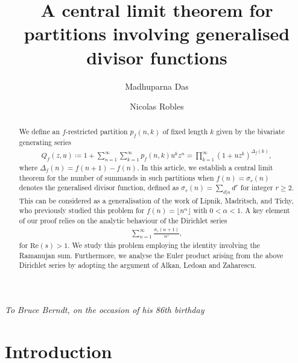 \documentclass[12pt, oneside,reqno]{amsart}
\title{A central limit theorem for partitions involving generalised divisor functions}
\author[1]{Madhuparna Das}
\author[2]{Nicolas Robles}
\date{}
\numberwithin{equation}{section}
\begin{document}
\maketitle

\begin{center}
{\it To Bruce Berndt, on the occasion of his 86th birthday}
\end{center}

\begin{abstract}
We define an $f$-restricted partition $p_f(n,k)$ of fixed length $k$ given by the bivariate generating series
\begin{align*}
Q_f(z,u) 
\coloneqq 1+\sum_{n=1}^{\infty}\sum_{k=1}^{\infty} p_f(n,k) u^kz^n
=\prod_{k=1}^{\infty}(1+uz^k)^{\Delta_f(k)},   
\end{align*}
where $\Delta_f(n)=f(n+1)-f(n)$. In this article, we establish a central limit theorem for the number of summands in such partitions when $f(n)=\sigma_r(n)$ denotes the generalised divisor function, defined as $\sigma_r(n)=\sum_{d|n}d^r$ for integer $r\geq 2$. This can be considered as a generalisation of the work of Lipnik, Madritsch, and Tichy, who previously studied this problem for $f(n)=\lfloor{n}^{\alpha}\rfloor$ with $0<\alpha<1$. A key element of our proof relies on the analytic behaviour of the Dirichlet series
\begin{align*}
\sum_{n=1}^{\infty}\frac{\sigma_r(n+1)}{n^s},    
\end{align*}
for $\mathrm{Re}(s)>1$. We study this problem employing the identity involving the Ramanujan sum. Furthermore, we analyse the Euler product arising from the above Dirichlet series by adopting the argument of Alkan, Ledoan and Zaharescu.
\end{abstract}

\section{Introduction}
\end{document}
